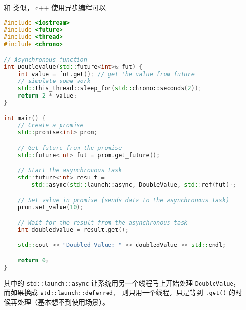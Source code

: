 

\begin{issues}
\issueDraft
\end{issues}

和 类似， c++ 使用异步编程可以

\begin{lstlisting}[language=cpp]
#include <iostream>
#include <future>
#include <thread>
#include <chrono>

// Asynchronous function
int DoubleValue(std::future<int>& fut) {
    int value = fut.get(); // get the value from future
    // simulate some work
    std::this_thread::sleep_for(std::chrono::seconds(2));
    return 2 * value;
}

int main() {
    // Create a promise
    std::promise<int> prom;

    // Get future from the promise
    std::future<int> fut = prom.get_future();

    // Start the asynchronous task
    std::future<int> result =
        std::async(std::launch::async, DoubleValue, std::ref(fut));

    // Set value in promise (sends data to the asynchronous task)
    prom.set_value(10);

    // Wait for the result from the asynchronous task
    int doubledValue = result.get();

    std::cout << "Doubled Value: " << doubledValue << std::endl;

    return 0;
}
\end{lstlisting}
其中的 \verb`std::launch::async` 让系统用另一个线程马上开始处理 \verb`DoubleValue`， 而如果换成 \verb`std::launch::deferred`， 则只用一个线程，只是等到 \verb`.get()` 的时候再处理（基本想不到使用场景）。

